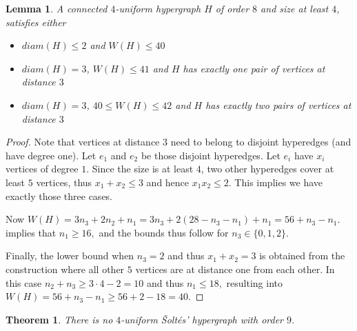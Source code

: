 \documentclass[a4paper,11pt]{article}
\newcommand{\diam}{diam}
\newtheorem{thm}[defi]{Theorem}
\newtheorem{lem}[defi]{Lemma}
\begin{document}
 \begin{lem}\label{lem:Wbound}
        A connected $4$-uniform hypergraph $H$ of order $8$ and size at least $4$, satisfies either 
        \begin{itemize}
            \item $\diam (H) \le 2$ and $W(H) \le 40$
            \item $\diam (H)  =3$, $W(H)\le 41$ and $H$ has exactly one pair of vertices at distance $3$ 
            \item $\diam(H)  =3$, $40\le W(H) \le 42$ and $H$ has exactly two pairs of vertices at distance $3$ 
        \end{itemize}
    \end{lem}
    \begin{proof}
        Note that vertices at distance $3$ need to belong to disjoint hyperedges (and have degree one).
        Let $e_1$ and $e_2$ be those disjoint hyperedges. Let $e_i$ have $x_i$ vertices of degree $1.$
        Since the size is at least $4$, two other hyperedges cover at least $5$ vertices, thus $x_1+x_2 \le 3$ and hence $x_1 x_2 \le 2.$
        This implies we have exactly those three cases.

        Now $W(H)=3n_3+2n_2+n_1= 3n_3+2(28-n_3-n_1)+n_1=56+n_3-n_1.$
         implies that $n_1 \ge 16,$ and the bounds thus follow for $n_3 \in \{0,1,2\}.$

        Finally, the lower bound when $n_3=2$ and thus $x_1+x_2=3$ is obtained from the construction where all other $5$ vertices are at distance one from each other. In this case $n_2+n_3 \ge 3 \cdot 4-2=10$ and thus $n_1 \le 18,$ resulting into $W(H)=56+n_3-n_1\ge 56+2-18=40.$
    \end{proof}

\begin{thm}\label{thm:no4unif_n9}
     There is no $4$-uniform \v Solt\'es' hypergraph with order $9$.
\end{thm}
\end{document}
